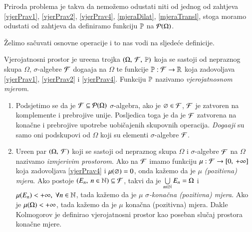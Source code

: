 Priroda problema je takva da nemo\v zemo odustati niti od jednog od
zahtjeva \eqref{vjerPrav1}, \eqref{vjerPrav2}, \eqref{vjerPrav4},
\eqref{mjeraDilat}, \eqref{mjeraTransl}, stoga moramo odustati od
zahtjeva da definiramo funkciju $\mathbb{P}$ na $\mathcal{P}({\Omega})$.

\v Zelimo sa\v cuvati osnovne operacije i to nas vodi na sljede\' ce
definicije.

\begin{defn}
    Vjerojatnosni prostor je ure\dj ena trojka
    $(\Omega, \: \mathcal{F}, \: \mathbb{P})$ koja se sastoji od nepraznog skupa
    $\Omega$, $\sigma$-algebre $\mathcal{F}$ doga\dj aja na $\Omega$ te
    funkcije $\mathbb{P}: \mathcal{F} \to \mathbb{R}$ koja zadovoljava \eqref{vjerPrav1},
    \eqref{vjerPrav2} i \eqref{vjerPrav4}.
    Funkciju $\mathbb{P}$ nazivamo \emph{vjerojatnosnom mjerom}.
\end{defn}

\begin{nap}
    \begin{enumerate}[label=(\alph*)]
        \item Podsjetimo se da je $\mathcal{F} \subseteq \mathcal{P}({\Omega})$
            $\sigma$-algebra, ako je $\varnothing \in \mathcal{F}$, $\mathcal{F}$ je
            zatvoren na komplemente i prebrojive unije. Posljedica
            toga je da je $\mathcal{F}$ zatvorena na kona\v cne i prebrojive
            upotrebe uobi\v cajenih skupovnih operacija.
            \emph{Doga\dj aji}  su samo oni podskupovi od $\Omega$
            koji su elementi $\sigma$-algebre $\mathcal{F}$.
        \item Ure\dj en par $(\Omega, \: \mathcal{F})$ koji se sastoji od
            nepraznog skupa $\Omega$ i $\sigma$-algebre $\mathcal{F}$ na
            $\Omega$ nazivamo \emph{izmjerivim prostorom}.
            Ako na $\mathcal{F}$ imamo funkciju $\mu : \mathcal{F} \to
            [{0}, \:{+ \infty}]$ koja zadovoljava \eqref{vjerPrav4}
            i $\mu({\varnothing}) = 0$, onda ka\v zemo da je $\mu$
            \emph{(pozitivna) mjera}.
            Ako postoje $(E_n, \: n \in \mathbb{N}) \subseteq \mathcal{F}$, takvi da
            je $\bigcup\limits_{n \in \mathbb{N}}^{} E_n = \Omega$ i $\mu({E_n}) <
            +\infty, \; \forall n \in \mathbb{N}$, tada ka\v zemo da je $\mu$
            \emph{$\sigma$-kona\v cna (pozitivna) mjera}.
            Ako je $\mu({\Omega}) < +\infty$, tada ka\v zemo da je
            $\mu$ kona\v cna (pozitivna) mjera.
            Dakle Kolmogorov je definirao vjerojatnosni prostor kao
            poseban slu\v caj prostora kona\v cne mjere.
    \end{enumerate}
\end{nap}